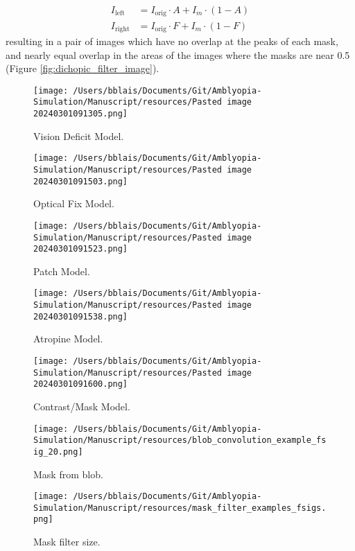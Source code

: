 \documentclass[
]{article}
\begin{document}
\[
\begin{aligned}
I_{\text{left}} &= I_{\text{orig}} \cdot A + I_m\cdot(1-A) \\
I_{\text{right}} &= I_{\text{orig}} \cdot F + I_m\cdot(1-F)
\end{aligned}
\] resulting in a pair of images which have no overlap at the peaks of
each mask, and nearly equal overlap in the areas of the images where the
masks are near 0.5 (Figure \ref{fig:dichopic_filter_image}).

\begin{figure}
\centering
\texttt{[image: /Users/bblais/Documents/Git/Amblyopia-Simulation/Manuscript/resources/Pasted image 20240301091305.png]}
\caption{Vision Deficit Model.}\label{fig:vision_deficit_model}
\end{figure}

\begin{figure}
\centering
\texttt{[image: /Users/bblais/Documents/Git/Amblyopia-Simulation/Manuscript/resources/Pasted image 20240301091503.png]}
\caption{Optical Fix Model.}\label{fig:optical_fix_model}
\end{figure}

\begin{figure}
\centering
\texttt{[image: /Users/bblais/Documents/Git/Amblyopia-Simulation/Manuscript/resources/Pasted image 20240301091523.png]}
\caption{Patch Model.}\label{fig:patch_model}
\end{figure}

\begin{figure}
\centering
\texttt{[image: /Users/bblais/Documents/Git/Amblyopia-Simulation/Manuscript/resources/Pasted image 20240301091538.png]}
\caption{Atropine Model.}\label{fig:atropine_model}
\end{figure}

\begin{figure}
\centering
\texttt{[image: /Users/bblais/Documents/Git/Amblyopia-Simulation/Manuscript/resources/Pasted image 20240301091600.png]}
\caption{Contrast/Mask Model.}\label{fig:contrast_mask_model}
\end{figure}

\begin{figure}
\centering
\texttt{[image: /Users/bblais/Documents/Git/Amblyopia-Simulation/Manuscript/resources/blob\_convolution\_example\_fsig\_20.png]}
\caption{Mask from blob.}\label{fig:dichopic_blob}
\end{figure}

\begin{figure}
\centering
\texttt{[image: /Users/bblais/Documents/Git/Amblyopia-Simulation/Manuscript/resources/mask\_filter\_examples\_fsigs.png]}
\caption{Mask filter size.}\label{fig:dichopic_filter_size}
\end{figure}
\end{document}
